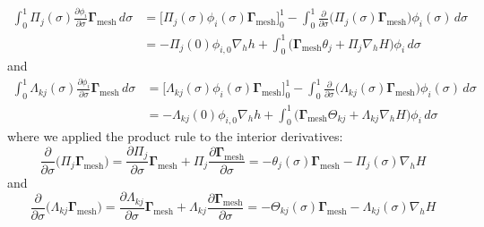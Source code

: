 \documentclass{article}
\newcommand{\nablah}{\nabla_h}
\newcommand{\Gam}{\boldsymbol{\Gamma}_{\text{mesh}}}
\begin{document}
\begin{itemize}
\begin{align*}
        \int_0^1 \Pi_j(\sigma) \frac{\partial \phi_i}{\partial \sigma} \Gam \, d\sigma &= \Big[ \Pi_j(\sigma) \phi_i(\sigma) \Gam \Big]_0^1 - \int_0^1 \frac{\partial}{\partial \sigma}\Big(\Pi_j(\sigma) \Gam\Big)\phi_i(\sigma)\,d\sigma \\
        &= - \Pi_j(0)\phi_{i,0}\nablah h + \int_0^1  \big(\Gam\theta_j + \Pi_j\nablah H\big)\phi_i\,d\sigma 
    \end{align*}
    and
    \begin{align*}
        \int_0^1 \Lambda_{kj}(\sigma) \frac{\partial \phi_i}{\partial \sigma} \Gam \, d\sigma &= \Big[ \Lambda_{kj}(\sigma) \phi_i(\sigma) \Gam \Big]_0^1 - \int_0^1  \frac{\partial}{\partial \sigma}\Big(\Lambda_{kj}(\sigma) \Gam\Big)\phi_i(\sigma)\,d\sigma \\
        &= - \Lambda_{kj}(0)\phi_{i,0}\nablah h + \int_0^1 \big(\Gam\Theta_{kj} + \Lambda_{kj}\nablah H\big)\phi_i\,d\sigma
    \end{align*}
    where we applied the product rule to the interior derivatives:
    $$\frac{\partial}{\partial \sigma}\Big(\Pi_j \Gam\Big) = \frac{\partial \Pi_j}{\partial \sigma}\Gam + \Pi_j \frac{\partial \Gam}{\partial \sigma} = -\theta_j(\sigma)\Gam - \Pi_j(\sigma)\nablah H$$
    and
    $$\frac{\partial}{\partial \sigma}\Big(\Lambda_{kj} \Gam\Big) = \frac{\partial \Lambda_{kj}}{\partial \sigma}\Gam + \Lambda_{kj} \frac{\partial \Gam}{\partial \sigma} = -\Theta_{kj}(\sigma)\Gam - \Lambda_{kj}(\sigma)\nablah H$$
    

\end{itemize}
\end{document}
